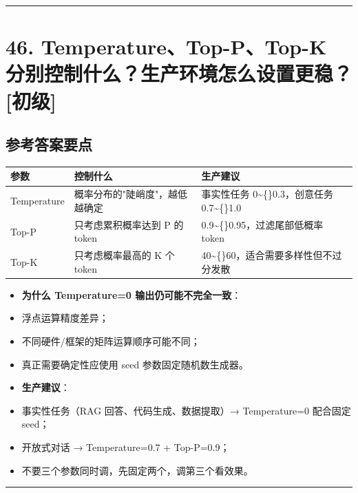 \documentclass[9pt,a4paper,twocolumn]{ctexart}
\newcommand{\lvchu}{\usebox{\badgechubox}}
\def\lvchu{[初级]}%
\begin{document}
\vspace{2pt}
\noindent\rule{\columnwidth}{0.3pt}\vspace{2pt}



\section*{46. Temperature、Top-P、Top-K 分别控制什么？生产环境怎么设置更稳？ \lvchu{}}


\subsection*{参考答案要点}

{\footnotesize
\begin{tabular}{|p{}|p{}|p{}|}
\hline
\textbf{参数} & \textbf{控制什么} & \textbf{生产建议} \\
\hline
Temperature & 概率分布的"陡峭度"，越低越确定 & 事实性任务 0\textasciitilde\{\}0.3，创意任务 0.7\textasciitilde\{\}1.0 \\
\hline
Top-P & 只考虑累积概率达到 P 的 token & 0.9\textasciitilde\{\}0.95，过滤尾部低概率 token \\
\hline
Top-K & 只考虑概率最高的 K 个 token & 40\textasciitilde\{\}60，适合需要多样性但不过分发散 \\
\hline
\end{tabular}
}


\begin{itemize}[itemsep=1pt, topsep=2pt]
  \item \textbf{为什么 Temperature=0 输出仍可能不完全一致}：
  \item 浮点运算精度差异；
  \item 不同硬件/框架的矩阵运算顺序可能不同；
  \item 真正需要确定性应使用 seed 参数固定随机数生成器。
  \item \textbf{生产建议}：
  \item 事实性任务（RAG 回答、代码生成、数据提取）→ Temperature=0 配合固定 seed；
  \item 开放式对话 → Temperature=0.7 + Top-P=0.9；
  \item 不要三个参数同时调，先固定两个，调第三个看效果。
\end{itemize}


\vspace{2pt}
\noindent\rule{\columnwidth}{0.3pt}\vspace{2pt}
\end{document}

